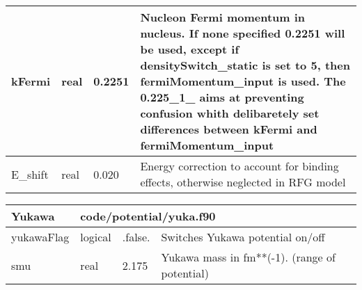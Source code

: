 \documentclass{article}
\begin{document}
\begin{longtable}{llll}
\midrule
kFermi & \begin{minipage}[t]{2cm}real\end{minipage} & \begin{minipage}[t]{2cm}0.2251\end{minipage} & \begin{minipage}[t]{12cm}Nucleon Fermi momentum in nucleus. If none specified 0.2251 will be used, except if densitySwitch\_static is set to 5, then fermiMomentum\_input is used. The 0.225\_1\_ aims at preventing confusion whith delibaretely set differences between kFermi and fermiMomentum\_input\end{minipage}\\*
\midrule
E\_shift & \begin{minipage}[t]{2cm}real\end{minipage} & \begin{minipage}[t]{2cm}0.020\end{minipage} & \begin{minipage}[t]{12cm}Energy correction to account for binding effects, otherwise neglected in RFG model\end{minipage}\\*
\bottomrule
\end{longtable}
{ }




\begin{longtable}{llll}
\toprule
\textbf{\large{Yukawa}} & \multicolumn{3}{l}{\footnotesize{code/potential/yuka.f90}}\\*
\midrule
\endfirsthead
\midrule
\endhead
yukawaFlag & \begin{minipage}[t]{2cm}logical\end{minipage} & \begin{minipage}[t]{2cm}.false.\end{minipage} & \begin{minipage}[t]{12cm}Switches Yukawa potential on/off\end{minipage}\\*
\midrule
smu & \begin{minipage}[t]{2cm}real\end{minipage} & \begin{minipage}[t]{2cm}2.175\end{minipage} & \begin{minipage}[t]{12cm}Yukawa mass in fm**(-1). (range of potential)\end{minipage}\\*
\bottomrule
\end{longtable}
{ }
\end{document}
